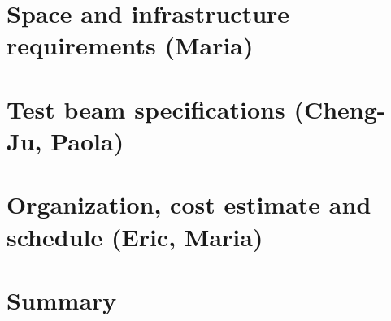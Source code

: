 \documentclass[12pt]{article}
\begin{document}
\section{Space and infrastructure requirements {\color{red} (Maria)}}


\section{Test beam specifications {\color{red} (Cheng-Ju, Paola)}} 


\section{Organization, cost estimate and schedule {\color{red} (Eric, Maria)}}



%
% 


\newpage
\section{Summary}


\newpage



% 
\end{document}
